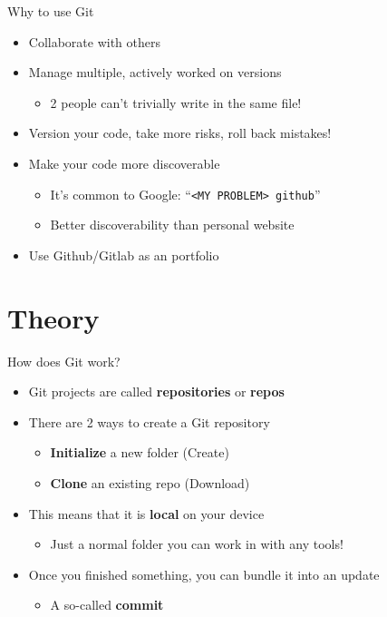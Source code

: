 \documentclass[compress,aspectratio=169]{beamer}
\begin{document}
  \begin{frame}{Why to use Git}
    \begin{itemize}
      \item Collaborate with others
      \item Manage multiple, actively worked on versions
        \begin{itemize}
          \item 2 people can't trivially write in the same file!
        \end{itemize}
      \item Version your code, take more risks, roll back mistakes!
      \item Make your code more discoverable
        \begin{itemize}
          \item It's common to Google: ``\texttt{<MY PROBLEM> github}''
          \item Better discoverability than personal website
        \end{itemize}
      \item Use Github/Gitlab as an portfolio
    \end{itemize}
  \end{frame}

	\section{Theory}

	\begin{frame}{How does Git work?}
		\begin{itemize}
      \item Git projects are called \textbf{repositories} or \textbf{repos}
      \item There are 2 ways to create a Git repository
        \begin{itemize}
          \item \textbf{Initialize} a new folder (Create)
          \item \textbf{Clone} an existing repo (Download)
        \end{itemize}
      \item This means that it is \textbf{local} on your device
        \begin{itemize}
          \item Just a normal folder you can work in with any tools!
        \end{itemize}
      \item Once you finished something, you can bundle it into an update
        \begin{itemize}
          \item A so-called \textbf{commit}
        \end{itemize}
		\end{itemize}
	\end{frame}
\end{document}
